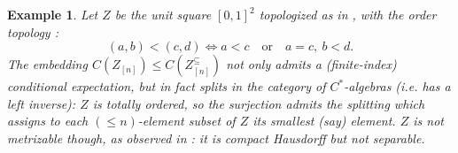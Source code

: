 \documentclass[11pt,leqno]{article}
\theoremstyle{plain}
\theoremstyle{plain}
\theoremstyle{plain}
\newtheorem{example}[lemma]{Example}
\numberwithin{equation}{section}
\theoremstyle{nonumberplain}
\newcommand\1{{\bf 1}}
\begin{document}
\begin{example}\label{ex:lex.sq}
  Let $Z$ be the unit square $[0,1]^2$ topologized as in \cite[Example 48]{ss_countertop}, with the {\it order topology} \cite[Example 39]{ss_countertop}:
  \begin{equation*}
    (a,b)<(c,d)
    \iff
    a<c
    \quad\text{or}\quad
    a=c,\ b<d.
  \end{equation*}
  The embedding $C\left(Z_{[n]}\right)\le C\left(Z^{\subseteq}_{[n]}\right)$ not only admits a (finite-index) conditional expectation, but in fact splits in the category of $C^*$-algebras (i.e. has a left inverse): $Z$ is totally ordered, so the surjection  admits the splitting which assigns to each $(\le n)$-element subset of $Z$ its smallest (say) element. $Z$ is not metrizable though, as observed in \cite[Example 48, item 4.]{ss_countertop}: it is compact Hausdorff but not separable.
\end{example}
\end{document}
